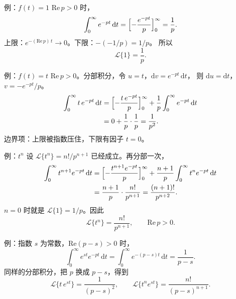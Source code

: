 \documentclass[fontset=windows, chinese, 10pt, xcolor=dvipsnames]{beamer}
\begin{document}
\begin{frame}{例：$f(t)=1$}
  $\mathrm{Re}\,p>0$ 时，
  \begin{equation*}
    \int_0^{\infty} e^{-pt}\,\mathrm{d}t
    =\Bigl[-\frac{e^{-pt}}{p}\Bigr]_0^{\infty}
    =\frac{1}{p}.
  \end{equation*}
  上限：$e^{-(\mathrm{Re}\,p)\,t}\to 0$。下限：$-(-1/p)=1/p$。
  所以
  \begin{equation*}
    \mathcal{L}\{1\}=\frac{1}{p}.
  \end{equation*}
\end{frame}

\begin{frame}{例：$f(t)=t$}
  $\mathrm{Re}\,p>0$。分部积分，令 $u=t$，$\mathrm{d}v=e^{-pt}\,\mathrm{d}t$，
  则 $\mathrm{d}u=\mathrm{d}t$，$v=-e^{-pt}/p$。
  \begin{align*}
    \int_0^{\infty} t\,e^{-pt}\,\mathrm{d}t
    &=\Bigl[-\frac{t\,e^{-pt}}{p}\Bigr]_0^{\infty}
      +\frac{1}{p}\int_0^{\infty} e^{-pt}\,\mathrm{d}t \\
    &=0+\frac{1}{p}\cdot\frac{1}{p}
     =\frac{1}{p^2}.
  \end{align*}
  边界项：上限被指数压住，下限有因子 $t=0$。
\end{frame}

\begin{frame}{例：$t^n$}
  设 $\mathcal{L}\{t^n\}=n!/p^{n+1}$ 已经成立。再分部一次，
  \begin{align*}
    \int_0^{\infty} t^{n+1}e^{-pt}\,\mathrm{d}t
    &=\Bigl[-\frac{t^{n+1}e^{-pt}}{p}\Bigr]_0^{\infty}
      +\frac{n+1}{p}\int_0^{\infty} t^n e^{-pt}\,\mathrm{d}t \\
    &=\frac{n+1}{p}\cdot\frac{n!}{p^{n+1}}
     =\frac{(n+1)!}{p^{n+2}}.
  \end{align*}
  $n=0$ 时就是 $\mathcal{L}\{1\}=1/p$。因此
  \begin{equation*}
    \mathcal{L}\{t^n\}=\frac{n!}{p^{n+1}},
    \qquad \mathrm{Re}\,p>0.
  \end{equation*}
\end{frame}

\begin{frame}{例：指数}
  $s$ 为常数，$\mathrm{Re}(p-s)>0$ 时，
  \begin{equation*}
    \int_0^{\infty} e^{st}e^{-pt}\,\mathrm{d}t
    =\int_0^{\infty} e^{-(p-s)t}\,\mathrm{d}t
    =\frac{1}{p-s}.
  \end{equation*}
  同样的分部积分，把 $p$ 换成 $p-s$，得到
  \begin{equation*}
    \mathcal{L}\{t\,e^{st}\}=\frac{1}{(p-s)^2},
    \qquad
    \mathcal{L}\{t^n e^{st}\}=\frac{n!}{(p-s)^{n+1}}.
  \end{equation*}
\end{frame}
\end{document}
